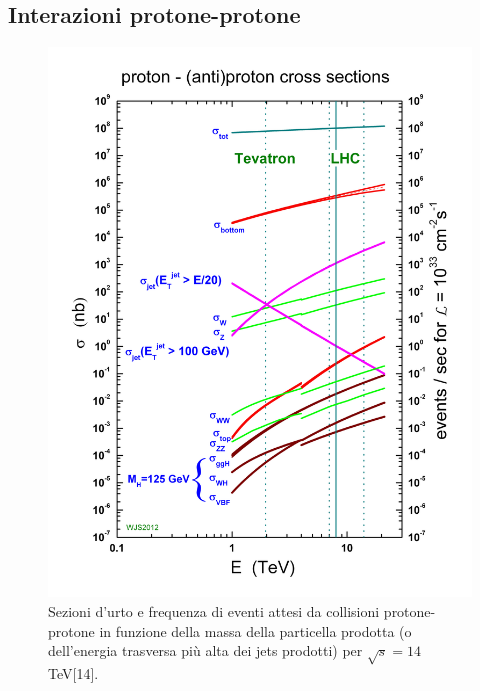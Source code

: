 \subsection{Interazioni protone-protone}

\begin{figure}[!htb]
  \centering
    \includegraphics[width=.5\textwidth]{figures/crosssections2013.jpg}
  \caption{Sezioni d'urto e frequenza di eventi attesi da collisioni protone-protone in funzione della massa della particella prodotta (o dell'energia trasversa pi\`u alta dei jets prodotti) per $\sqrt{s}=14$ TeV[14].}
  \label{fig:LHC_pp_cross_section}
\end{figure}

